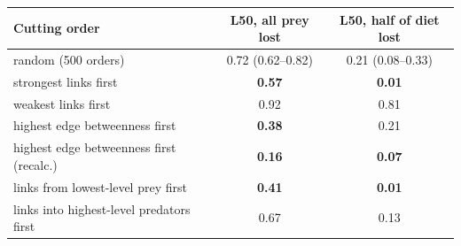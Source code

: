 \begin{tabular}{lcc}
\hline
Cutting order & L50, all prey lost & L50, half of diet lost \\
\hline
random (500 orders) & 0.72 (0.62--0.82) & 0.21 (0.08--0.33) \\
strongest links first & \textbf{0.57} & \textbf{0.01} \\
weakest links first & 0.92 & 0.81 \\
highest edge betweenness first & \textbf{0.38} & 0.21 \\
highest edge betweenness first (recalc.) & \textbf{0.16} & \textbf{0.07} \\
links from lowest-level prey first & \textbf{0.41} & \textbf{0.01} \\
links into highest-level predators first & 0.67 & 0.13 \\
\hline
\end{tabular}

